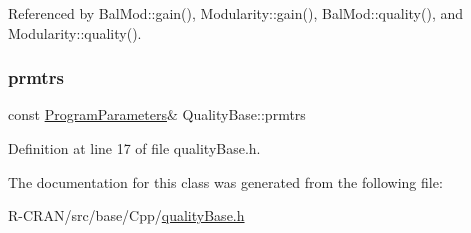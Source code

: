 Referenced by Bal\+Mod\+::gain(), Modularity\+::gain(), Bal\+Mod\+::quality(), and Modularity\+::quality().

\mbox{\label{classQualityBase_a02bb6bd03a001360b57de99f3d18fba3}} 
\subsubsection{\texorpdfstring{prmtrs}{prmtrs}}
{\footnotesize\ttfamily const \hyperlink{structProgramParameters}{Program\+Parameters}\& Quality\+Base\+::prmtrs\hspace{0.3cm}{\ttfamily [protected]}}



Definition at line 17 of file quality\+Base.\+h.



The documentation for this class was generated from the following file\+:\begin{DoxyCompactItemize}
\item 
R-\/\+C\+R\+A\+N/src/base/\+Cpp/\hyperlink{qualityBase_8h}{quality\+Base.\+h}\end{DoxyCompactItemize}
